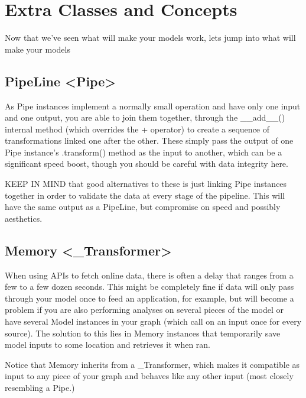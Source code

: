 \documentclass[letterpaper,10pt,english]{sphinxmanual}
\begin{document}
\section{Extra Classes and Concepts}
\label{\detokenize{beginners-guide:extra-classes-and-concepts}}
Now that we’ve seen what will make your models work, lets jump into what will make your models 


\subsection{PipeLine \textless{}Pipe\textgreater{}}
\label{\detokenize{beginners-guide:pipeline-pipe}}\label{\detokenize{beginners-guide:pipeline}}
As Pipe instances implement a normally small operation and have only one input and one output, you are able to join them together, through the \_\_add\_\_() internal method (which overrides the + operator) to create a sequence of transformations linked one after the other. These simply pass the output of one Pipe instance’s .transform() method as the input to another, which can be a significant speed boost, though you should be careful with data integrity here.

KEEP IN MIND that good alternatives to these is just linking Pipe instances together in order to validate the data at every stage of the pipeline. This will have the same output as a PipeLine, but compromise on speed and possibly aesthetics.


\subsection{Memory \textless{}\_Transformer\textgreater{}}
\label{\detokenize{beginners-guide:memory-transformer}}
When using APIs to fetch online data, there is often a delay that ranges from a few to a few dozen seconds. This might be completely fine if data will only pass through your model once to feed an application, for example, but will become a problem if you are also performing analyses on several pieces of the model or have several Model instances in your graph (which call on an input once for every source). The solution to this lies in Memory instances that temporarily save model inputs to some location and retrieves it when ran.

Notice that Memory inherits from a \_Transformer, which makes it compatible as input to any piece of your graph and behaves like any other input (most closely resembling a Pipe.)
\end{document}
